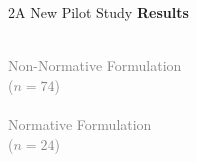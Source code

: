 \documentclass[xcolor=table,9pt,aspectratio=169]{beamer}
\begin{document}
\begin{frame}{\vspace*{10mm}2\hspace*{1em}A New Pilot Study}
   \textbf{Results}
   \begin{multicols}{2}
      \begin{center}
         \\
         \textcolor{gray}{Non-Normative Formulation\\($n=74$)}\\
         \\
         \textcolor{gray}{Normative Formulation\\($n=24$)}\\
      \end{center}
   \end{multicols}
\end{frame}
\end{document}
